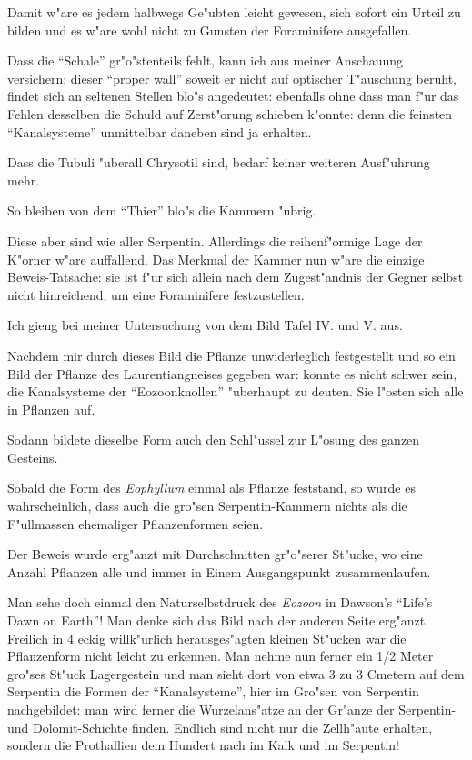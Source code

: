 \documentclass[a4paper, 11pt, oneside, german]{article}
\begin{document}
Damit w"are es jedem halbwegs Ge"ubten leicht gewesen, sich sofort ein Urteil zu bilden und es w"are wohl nicht zu Gunsten der Foraminifere ausgefallen.

Dass die "`Schale"' gr"o"stenteils fehlt, kann ich aus meiner Anschauung versichern; dieser "`proper wall"' soweit er nicht auf optischer T"auschung beruht, findet sich an seltenen Stellen blo"s angedeutet: ebenfalls ohne dass man f"ur das Fehlen desselben die Schuld auf Zerst"orung schieben k"onnte: denn die feinsten "`Kanalsysteme"' unmittelbar daneben sind ja erhalten.

Dass die Tubuli "uberall Chrysotil sind, bedarf keiner weiteren Ausf"uhrung mehr.

So bleiben von dem "`Thier"' blo"s die Kammern "ubrig.

Diese aber sind wie aller Serpentin. Allerdings die reihenf"ormige Lage der K"orner w"are auffallend. Das Merkmal der Kammer nun w"are die einzige Beweis-Tatsache: sie ist f"ur sich allein nach dem Zugest"andnis der Gegner selbst nicht hinreichend, um eine Foraminifere festzustellen.

Ich gieng bei meiner Untersuchung von dem Bild Tafel IV. und V. aus.

Nachdem mir durch dieses Bild die Pflanze unwiderleglich festgestellt und so ein Bild der Pflanze des Laurentiangneises gegeben war: konnte es nicht schwer sein, die Kanalsysteme der "`Eozoonknollen"' "uberhaupt zu deuten. Sie l"osten sich alle in Pflanzen auf.

Sodann bildete dieselbe Form auch den Schl"ussel zur L"osung des ganzen Gesteins.

Sobald die Form des \emph{Eophyllum} einmal als Pflanze feststand, so wurde es wahrscheinlich, dass auch die gro"sen Serpentin-Kammern nichts als die F"ullmassen ehemaliger Pflanzenformen seien.

Der Beweis wurde erg"anzt mit Durchschnitten gr"o"serer St"ucke, wo eine Anzahl Pflanzen alle und immer in Einem Ausgangspunkt zusammenlaufen.

Man sehe doch einmal den Naturselbstdruck des \emph{Eozoon} in Dawson's "`Life's Dawn on Earth"'! Man denke sich das Bild nach der anderen Seite erg"anzt. Freilich in 4 eckig willk"urlich herausges"agten kleinen St"ucken war die Pflanzenform nicht leicht zu erkennen. Man nehme nun ferner ein 1/2 Meter gro"ses St"uck Lagergestein und man sieht dort von etwa 3 zu 3 Cmetern auf dem Serpentin die Formen der "`Kanalsysteme"', hier im Gro"sen von Serpentin nachgebildet: man wird ferner die Wurzelans"atze an der Gr"anze der Serpentin- und Dolomit-Schichte finden. Endlich sind nicht nur die Zellh"aute erhalten, sondern die Prothallien dem Hundert nach im Kalk und im Serpentin!
\end{document}
